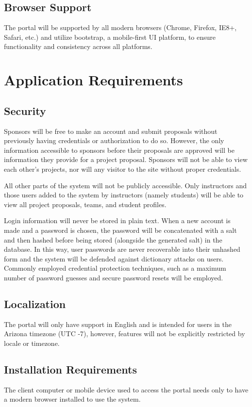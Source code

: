 \documentclass[12pt]{article}
\begin{document}
\subsection{Browser Support}
The portal will be supported by all modern browsers (Chrome, Firefox, IE8+, Safari, etc.) and utilize bootstrap, a mobile-first UI platform, to ensure functionality and consistency across all platforms.

\section{Application Requirements}

\subsection{Security}
Sponsors will be free to make an account and submit proposals without previously having credentials or authorization to do so. However, the only information accessible to sponsors before their proposals are approved will be information they provide for a project proposal. Sponsors will not be able to view each other's projects, nor will any visitor to the site without proper credentials.

All other parts of the system will not be publicly accessible. Only instructors and those users added to the system by instructors (namely students) will be able to view all project proposals, teams, and student profiles.

Login information will never be stored in plain text. When a new account is made and a password is chosen, the password will be concatenated with a salt and then hashed before being stored (alongside the generated salt) in the database. In this way, user passwords are never recoverable into their unhashed form and the system will be defended against dictionary attacks on users. Commonly employed credential protection techniques, such as a maximum number of password guesses and secure password resets will be employed.

\subsection{Localization}

The portal will only have support in English and is intended for users in the Arizona timezone (UTC -7), however, features will not be explicitly restricted by locale or timezone.

\subsection{Installation Requirements}

The client computer or mobile device used to access the portal needs only to have a modern browser installed to use the system.
\end{document}
